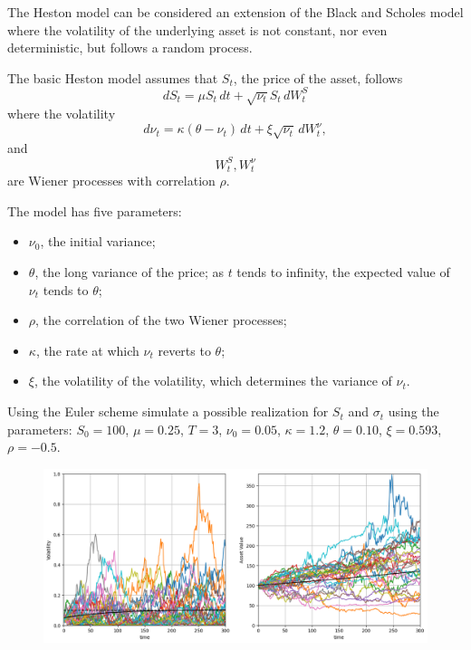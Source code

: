 \documentclass[12pt,a4paper]{article}
\begin{document}
\begin{question}
The Heston model can be considered an extension of the Black and Scholes model where the volatility of the underlying asset is not constant, nor even deterministic, but follows a random process.

The basic Heston model assumes that $S_t$, the price of the asset, follows
\begin{equation}
dS_{t}=\mu S_{t}\,dt+{\sqrt {\nu _{t}}}S_{t}\,dW_{t}^{S}
\end{equation}
where the volatility 
\begin{equation}
{\displaystyle d\nu _{t}=\kappa (\theta -\nu _{t})\,dt+\xi {\sqrt {\nu _{t}}}\,dW_{t}^{\nu },}
\end{equation}
and 
\begin{equation}
W_{t}^{S},W_{t}^{\nu }
\end{equation} 
are Wiener processes with correlation $\rho$.

The model has five parameters:
\begin{itemize}
\item $\nu _0$, the initial variance;
\item $\theta$, the long variance of the price; as $t$ tends to infinity, the expected value of $\nu_t$ tends to $\theta$;
\item $\rho$, the correlation of the two Wiener processes;
\item $\kappa$, the rate at which $\nu_t$ reverts to $\theta$;
\item $\xi$, the volatility of the volatility, which determines the variance of $\nu_t$.
\end{itemize}

Using the Euler scheme simulate a possible realization for $S_t$ and $\sigma_t$ using the parameters: $S_0=100$, $\mu=0.25$, $T=3$, $\nu_0=0.05$, $\kappa=1.2$, $\theta=0.10$, $\xi=0.593$, $\rho=-0.5$.

\begin{figure}[htbp]
\begin{center}
\includegraphics[width=0.8\linewidth]{addons/heston}
\end{center}
\label{fig:heston}
\end{figure}
\end{question}
\clearpage
\end{document}
